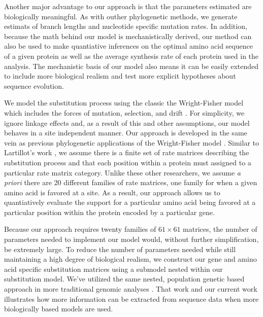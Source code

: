 \documentclass{article}
\begin{document}
Another major advantage to our approach is that the parameters estimated are biologically meaningful.
As with outher phylogenetic methods,  we generate estimats of branch lengths and nucleotide specific mutation rates.
In addition, because the math behind our model is mechanistically derived, our method can also be used to make quantiative inferences on the optimal amino acid sequence of a given protein as well as the average synthesis rate of each protein used in the analysis.
The mechanistic basis of our model also means it can be easily extended to include more biological realism and test more explicit hypotheses about sequence evolution.


We model the substitution process using the classic the Wright-Fisher model which includes the forces of mutation, selection, and drift \citep{Fisher1930,Kimura1962,Wright1969,Iwasa1988,BergAndLassig2003,SellaAndHirsh2005}.
For simplicity, we ignore linkage effects and, as a result of this and other assumptions, our model behaves in a site independent manner.
Our approach is developed in the same vein as previous phylogenetic applications of the Wright-Fisher model \citep[e.g.][]{MuseAndGaut1994,HalpernAndBruno1998,YangAndNielsen2008,RodrigueEtAl2005,KoshiAndGoldstein1997,KoshiEtAl1999,DimmicEtAl2000,ThorneEtAl2012,LartillotAndPhilippe2004,RodrigueAndLartillot2014}.
Similar to Lartillot's work \citep{LartillotAndPhilippe2004,RodrigueAndLartillot2014}, we assume there is a finite set of rate matrices describing the substitution process and that each position within a protein must assigned to a particular rate matrix category.
Unlike these other researchers, we assume \emph{a priori} there are 20 different families of rate matrices, one family for when a given amino acid is favored at a site.
As a result, our approach allows us to quantiatively evaluate the support for a particular amino acid being favored at a particular position within the protein encoded by a particular gene.

Because our approach requires twenty families of $61 \times 61$ matrices, the number of parameters needed to implement our model would, without further simplification, be extremely large.
To reduce the number of parameters needed while still maintaining a high degree of biological realism, we construct our gene and amino acid specific substitution matrices using a submodel nested within our substitution model.
We've utilized the same nested, population genetic based approach in more traditional genomic analyses \citep[e.g.][]{Gilchrist2007,ShahAndGilchrist2011,GilchristEtAl2015}.
That work and our current work illustrates how more information can be extracted from sequence data when more biologically based models are used.
\end{document}
